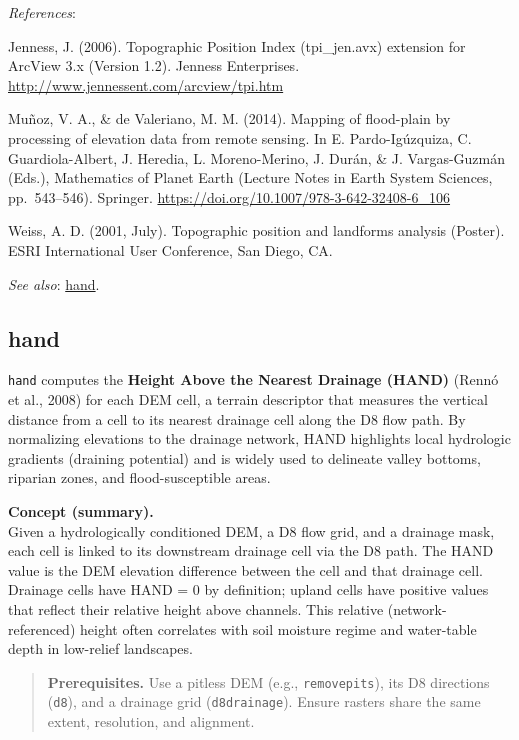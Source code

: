 \documentclass[
]{book}
\begin{document}
\emph{References}:

Jenness, J. (2006). Topographic Position Index (tpi\_jen.avx) extension for ArcView 3.x (Version 1.2). Jenness Enterprises. \url{http://www.jennessent.com/arcview/tpi.htm}

Muñoz, V. A., \& de Valeriano, M. M. (2014). Mapping of flood-plain by processing of elevation data from remote sensing. In E. Pardo-Igúzquiza, C. Guardiola-Albert, J. Heredia, L. Moreno-Merino, J. Durán, \& J. Vargas-Guzmán (Eds.), Mathematics of Planet Earth (Lecture Notes in Earth System Sciences, pp.~543--546). Springer. \url{https://doi.org/10.1007/978-3-642-32408-6_106}

Weiss, A. D. (2001, July). Topographic position and landforms analysis (Poster). ESRI International User Conference, San Diego, CA.

\emph{See also}: \hyperref[hand]{hand}.

\subsection{hand}\label{hand}

\texttt{hand} computes the \textbf{Height Above the Nearest Drainage (HAND)} (Rennó et al., 2008) for each DEM cell, a terrain descriptor that measures the vertical distance from a cell to its nearest drainage cell along the D8 flow path. By normalizing elevations to the drainage network, HAND highlights local hydrologic gradients (draining potential) and is widely used to delineate valley bottoms, riparian zones, and flood-susceptible areas.

\textbf{Concept (summary).}\\
Given a hydrologically conditioned DEM, a D8 flow grid, and a drainage mask, each cell is linked to its downstream drainage cell via the D8 path. The HAND value is the DEM elevation difference between the cell and that drainage cell. Drainage cells have HAND = 0 by definition; upland cells have positive values that reflect their relative height above channels. This relative (network-referenced) height often correlates with soil moisture regime and water-table depth in low-relief landscapes.

\begin{quote}
\textbf{Prerequisites.} Use a pitless DEM (e.g., \texttt{removepits}), its D8 directions (\texttt{d8}), and a drainage grid (\texttt{d8drainage}). Ensure rasters share the same extent, resolution, and alignment.
\end{quote}
\end{document}
